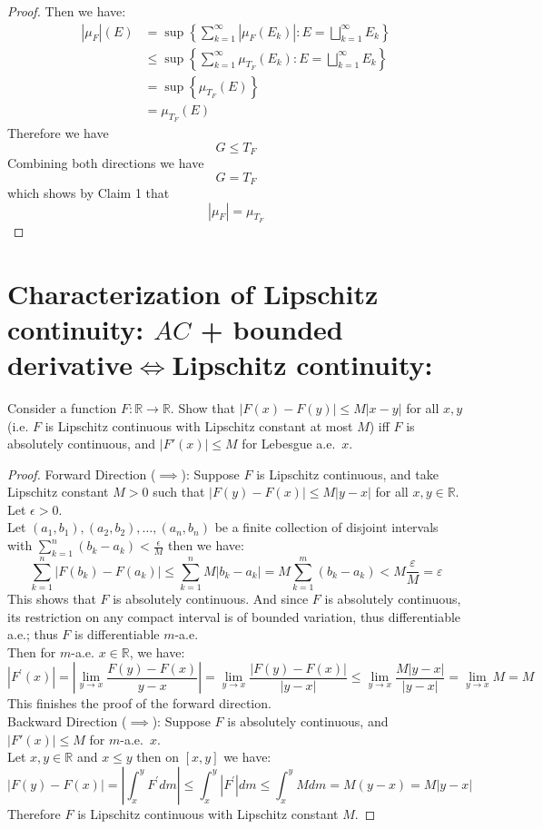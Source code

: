 \documentclass[lang=cn,11pt]{elegantbook}
\begin{document}
\begin{proof}
Then we have: $$
\begin{aligned}
\left|\mu_F\right|(E) & =\sup \left\{\sum_{k=1}^{\infty}\left|\mu_F\left(E_k\right)\right| :E=\bigsqcup_{k=1}^{\infty} E_k\right\} \\
& \leq \sup \left\{\sum_{k=1}^{\infty} \mu_{T_F}\left(E_k\right) :E=\bigsqcup_{k=1}^{\infty} E_k\right\} \\
& =\sup \left\{\mu_{T_F}(E)\right\}\\
& = \mu_{T_F}(E)
\end{aligned}
$$
Therefore we have \[
G \leq T_F
\]Combining both directions we have\[
G =  T_F
\]which shows by Claim 1 that \[
|\mu_F|=\mu_{T_F}
\]
\end{proof}




\section{Characterization of Lipschitz continuity: $AC$ + bounded derivative$\iff$Lipschitz continuity:}
Consider a function $F:\mathbb{R}\to \mathbb{R}$. 
Show that $|F(x)-F(y)|\le M|x-y|$ for all $x,y$ (i.e. $F$ is Lipschitz continuous with Lipschitz constant at most $M$) iff $F$ is absolutely continuous, and $|F'(x)|\le M$ for Lebesgue a.e.\ $x$. 
\begin{proof}
Forward Direction ($\implies$):  Suppose $F$ is Lipschitz continuous, and take Lipschitz constant $M >0$ such that $|F(y)-F(x)| \leq M|y-x|$ for all $x, y \in \mathbb{R}$. \\
Let $\epsilon > 0$.\\
Let $\left(a_1, b_1\right),\left(a_2, b_2\right), \ldots,\left(a_n, b_n\right)$ be a finite collection of disjoint intervals with $\sum_{k=1}^n\left(b_k-a_k\right)<\frac{\epsilon}{M}$ then we have:
$$
\sum_{k=1}^n\left|F\left(b_k\right)-F\left(a_k\right)\right| \leq \sum_{k=1}^n M\left|b_k-a_k\right|=M \sum_{k=1}^m\left(b_k-a_k\right)<M \frac{\varepsilon}{M}=\varepsilon 
$$
This shows that $F$ is absolutely continuous. And since $F$ is absolutely continuous, its restriction on any compact interval is of bounded variation, thus differentiable a.e.; thus $F$ is differentiable $m$-a.e.\\
Then for $m$-a.e. $x \in \mathbb{R}$, we have: 
$$
\left|F^{\prime}(x)\right|=\left|\lim _{y \rightarrow x} \frac{F(y)-F(x)}{y-x}\right|=\lim _{y \rightarrow x} \frac{|F(y)-F(x)|}{|y-x|} \leq \lim _{y \rightarrow x} \frac{M|y-x|}{|y-x|}=\lim _{y \rightarrow x} M=M
$$
This finishes the proof of the forward direction.\\
Backward Direction ($\implies$): Suppose $F$ is absolutely continuous, and $|F'(x)|\le M$ for $m$-a.e.\ $x$. \\
Let $x, y \in \mathbb{R}$ and $x \leq y$ then on $[x,y]$ we have: \[
|F(y)-F(x)|=\left|\int_x^y F^{\prime} d m\right| \leq \int_x^y\left|F^{\prime}\right| d m \leq \int_x^y M d m=M(y-x)=M|y-x|
\]  Therefore $F$ is Lipschitz continuous with Lipschitz constant $M$.
\end{proof}
\end{document}
